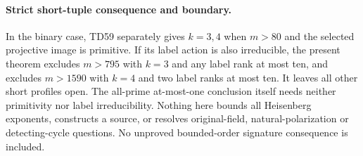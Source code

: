 \paragraph{Strict short-tuple consequence and boundary.}
In the binary case, TD59 separately gives $k=3,4$ when $m>80$
and the selected projective image is primitive.
If its label action is also irreducible, the present theorem
excludes $m>795$ with $k=3$ and any label rank at most ten,
and excludes $m>1590$ with $k=4$ and two label ranks at most ten.
It leaves all other short profiles open.
The all-prime at-most-one conclusion itself needs neither
primitivity nor label irreducibility.
Nothing here bounds all Heisenberg exponents, constructs a source,
or resolves original-field, natural-polarization or detecting-cycle
questions.  No unproved bounded-order signature consequence is included.
